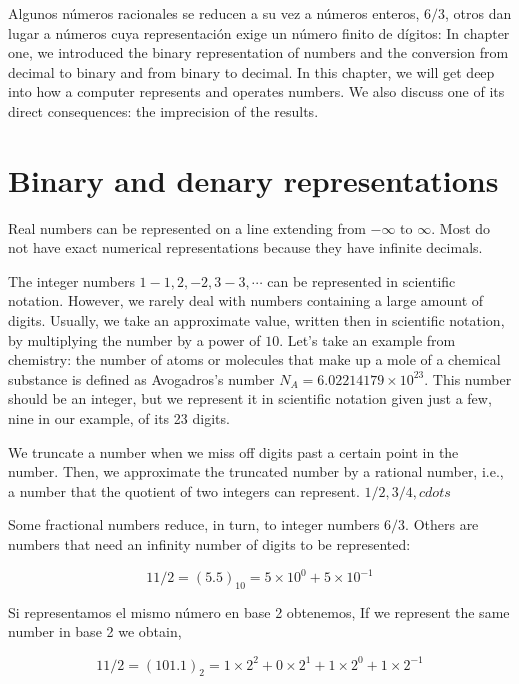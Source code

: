 \begin{paracol}{2}
Algunos números racionales se reducen a su vez a números enteros, $6/3$, otros dan lugar a números cuya representación exige un número finito de dígitos:
\switchcolumn
In chapter one, we introduced the binary representation of numbers and the conversion from decimal to binary and from binary to decimal. In this chapter, we will get deep into how a computer represents and operates numbers. We also discuss one of its direct consequences: the imprecision of the results.

\section{Binary and denary representations}

Real numbers can be represented on a line extending from $-\infty$ to $\infty$. Most do not have exact numerical representations because they have infinite decimals.

The integer numbers $1-1,2,-2,3-3,\cdots$ can be represented in scientific notation. However, we rarely deal with numbers containing a large amount of digits. Usually, we take an approximate value, written then in scientific notation, by multiplying the number by a power of $10$. Let's take an example from chemistry: the number of atoms or molecules that make up a mole of a chemical substance is defined as Avogadros's number $N_A = 6.02214179 \times 10^{23}$. This number should be an integer, but we represent it in scientific notation given just a few, nine in our example, of its 23 digits.

 We truncate a number when we miss off digits past a certain point in the number. Then, we approximate the truncated number by a rational number, i.e., a number that the quotient of two integers can represent. $1/2,3/4,cdots$

Some fractional numbers reduce, in turn, to integer numbers $6/3$. Others are numbers that need an infinity number of digits to be represented: 
\end{paracol}
\begin{equation*}
11/2=(5.5)_{10}=5\times10^0+5\times10^{-1}
\end{equation*}
\begin{paracol}{2}
Si representamos el mismo número en base 2 obtenemos,
\switchcolumn
If we represent the same number in base 2 we obtain,
\end{paracol}
\begin{equation*}
11/2=(101.1)_2=1\times2^2+0\times2^1+1\times2^0+1\times2^{-1}
\end{equation*}
